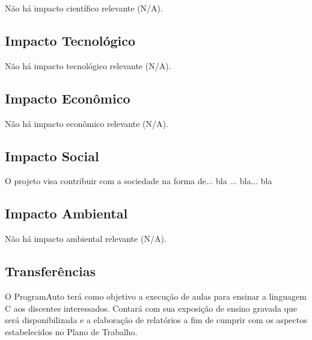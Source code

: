 \documentclass[a4paper,12pt]{article} %
\begin{document}
Não há impacto científico relevante (N/A).


\subsection{Impacto Tecnológico}

Não há impacto tecnológico relevante (N/A).


\subsection{Impacto Econômico}

Não há impacto econômico relevante (N/A).


\subsection{Impacto Social}

O projeto visa contribuir com a sociedade na forma de... bla ... bla... bla


\subsection{Impacto Ambiental}

Não há impacto ambiental relevante (N/A).


\subsection{Transferências}

O ProgramAuto terá como objetivo a execução de aulas para ensinar a linguagem C aos discentes interessados. Contará com sua exposição de ensino gravada que será disponibilizada e a elaboração de relatórios a fim de cumprir com os aspectos estabelecidos no Plano de Trabalho.
\end{document}
